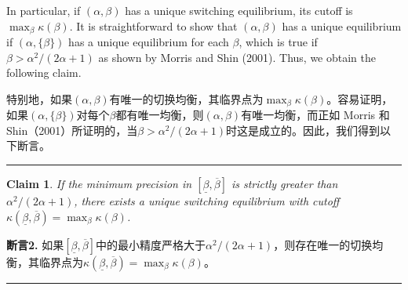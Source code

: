 \documentclass[12pt,a4paper]{article}
\newenvironment{original}
  {\par\medskip\noindent\color{black}\ignorespaces}
  {\par\medskip}
\newenvironment{translation}
  {\par\noindent\color{darkblue}\ignorespaces}
  {\par\medskip\noindent\hrule\par\medskip}
\newtheorem{claim}[theorem]{Claim}
\theoremstyle{definition}
\theoremstyle{remark}
\begin{document}
\begin{original}
In particular, if $(\alpha, \beta)$ has a unique switching equilibrium, its cutoff is $\max_{\beta} \kappa(\beta)$. It is straightforward to show that $(\alpha, \beta)$ has a unique equilibrium if $(\alpha, \{\beta\})$ has a unique equilibrium for each $\beta$, which is true if $\beta > \alpha^2/(2\alpha + 1)$ as shown by Morris and Shin (2001). Thus, we obtain the following claim.
\end{original}
\begin{translation}
特别地，如果$(\alpha, \beta)$有唯一的切换均衡，其临界点为$\max_{\beta} \kappa(\beta)$。容易证明，如果$(\alpha, \{\beta\})$对每个$\beta$都有唯一均衡，则$(\alpha, \beta)$有唯一均衡，而正如 Morris 和 Shin（2001）所证明的，当$\beta > \alpha^2/(2\alpha + 1)$时这是成立的。因此，我们得到以下断言。
\end{translation}

\begin{claim}
If the minimum precision in $[\underline{\beta}, \overline{\beta}]$ is strictly greater than $\alpha^2/(2\alpha + 1)$, there exists a unique switching equilibrium with cutoff $\kappa(\underline{\beta}, \overline{\beta}) = \max_{\beta} \kappa(\beta)$.
\end{claim}
\begin{translation}
\color{darkblue}\textbf{断言2.} 如果$[\underline{\beta}, \overline{\beta}]$中的最小精度严格大于$\alpha^2/(2\alpha + 1)$，则存在唯一的切换均衡，其临界点为$\kappa(\underline{\beta}, \overline{\beta}) = \max_{\beta} \kappa(\beta)$。
\end{translation}
\end{document}

